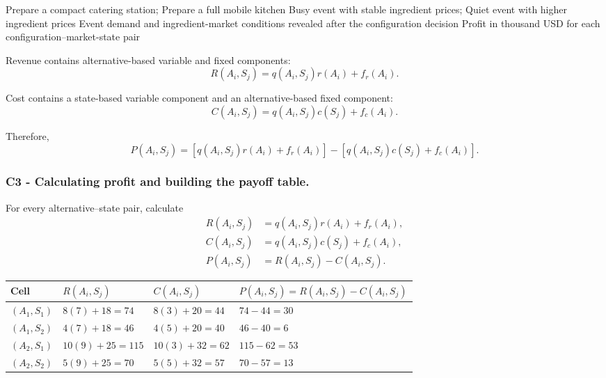 \DecisionElementsTable
{Prepare a compact catering station; Prepare a full mobile kitchen}
{Busy event with stable ingredient prices; Quiet event with higher ingredient prices}
{Event demand and ingredient-market conditions revealed after the configuration decision}
{Profit in thousand USD for each configuration--market-state pair}

Revenue contains alternative-based variable and fixed components:
\[
R(A_i,S_j)
=
q(A_i,S_j)r(A_i)+f_r(A_i).
\]

Cost contains a state-based variable component and an alternative-based
fixed component:
\[
C(A_i,S_j)
=
q(A_i,S_j)c(S_j)+f_c(A_i).
\]

Therefore,
\[
P(A_i,S_j)
=
\left[
q(A_i,S_j)r(A_i)+f_r(A_i)
\right]
-
\left[
q(A_i,S_j)c(S_j)+f_c(A_i)
\right].
\]


\subsubsection*{C3 - Calculating profit and building the payoff table.}
\label{subsec:problem10-mobile-catering-configuration-c3}

For every alternative--state pair, calculate
\[
\begin{aligned}
	R(A_i,S_j)
	&=
	q(A_i,S_j)r(A_i)+f_r(A_i),
	\\
	C(A_i,S_j)
	&=
	q(A_i,S_j)c(S_j)+f_c(A_i),
	\\
	P(A_i,S_j)
	&=
	R(A_i,S_j)-C(A_i,S_j).
\end{aligned}
\]

\begin{center}
	\small
	\begin{tabular}{llll}
		\toprule
		Cell
		& \(R(A_i,S_j)\)
		& \(C(A_i,S_j)\)
		& \(P(A_i,S_j)=R(A_i,S_j)-C(A_i,S_j)\) \\
		\midrule
		\((A_1,S_1)\)
		& \(8(7)+18=74\)
		& \(8(3)+20=44\)
		& \(74-44=30\) \\
		
		\((A_1,S_2)\)
		& \(4(7)+18=46\)
		& \(4(5)+20=40\)
		& \(46-40=6\) \\
		
		\((A_2,S_1)\)
		& \(10(9)+25=115\)
		& \(10(3)+32=62\)
		& \(115-62=53\) \\
		
		\((A_2,S_2)\)
		& \(5(9)+25=70\)
		& \(5(5)+32=57\)
		& \(70-57=13\) \\
		\bottomrule
	\end{tabular}
\end{center}

